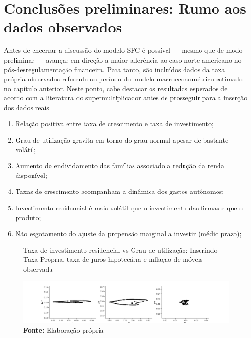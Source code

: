 \section{Conclusões preliminares: Rumo aos dados observados}\label{Conclusao_Modelo}


Antes de encerrar a discussão do modelo SFC é possível  --- mesmo que de modo preliminar --- avançar em direção a maior aderência ao caso norte-americano no pós-desregulamentação financeira.
Para tanto, são incluídos dados da taxa própria observados referente ao período do modelo macroeconométrico estimado no capítulo anterior.
Neste ponto, cabe destacar os resultados esperados de acordo com a literatura do supermultiplicador antes de prosseguir para a inserção dos dados reais:

\begin{enumerate}
\item Relação positiva entre taxa de crescimento e taxa de investimento;
\item Grau de utilização gravita em torno do grau normal apesar de bastante volátil;
\item Aumento do endividamento das famílias associado a redução da renda disponível;
\item Taxas de crescimento acompanham a dinâmica dos gastos autônomos;
\item Investimento residencial é mais volátil que o investimento das firmas e que o produto;
\item Não esgotamento do ajuste da propensão marginal a investir (médio prazo);
\end{enumerate}

\begin{figure}[H]
	\centering
	\caption{Taxa de investimento residencial vs Grau de utilização: Inserindo Taxa Própria, taxa de juros hipotecária e inflação de móveis observada}
	\label{clock_Real}
	\includegraphics[width=\textwidth]{../../Modelo/Versoes/Clock_Real.png}
	\caption*{\textbf{Fonte:} Elaboração própria}
\end{figure}


